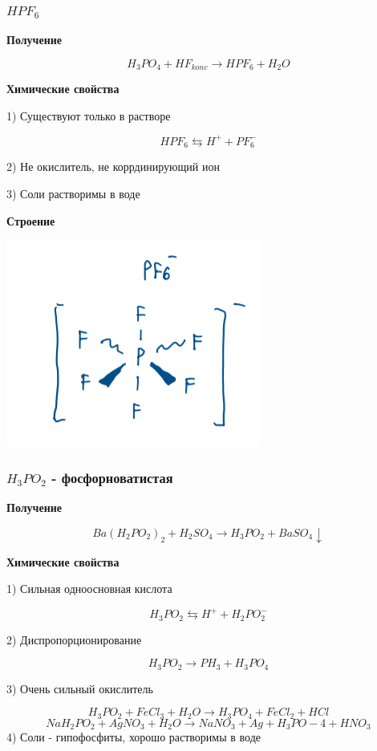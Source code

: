 \subsubsection*{$HPF_6$}

\textbf{Получение}

$$H_3PO_4 + HF_{konc} \rightarrow HPF_6 + H_2O$$

\textbf{Химические свойства}

1) Существуют только в растворе

$$HPF_6 \leftrightarrows H^+ + PF_6^-$$

2) Не окислитель, не коррдинирующий ион

3) Соли растворимы в воде

\textbf{Строение}

\includegraphics{images/9v7.png}

\subsubsection*{$H_3PO_2$ - фосфорноватистая}

\textbf{Получение}

$$Ba(H_2PO_2)_2 + H_2SO_4 \rightarrow H_3PO_2 + BaSO_4 \downarrow$$

\textbf{Химические свойства}

1) Сильная одноосновная кислота

$$H_3PO_2 \leftrightarrows H^+ + H_2PO_2^-$$

2) Диспропорционирование 

$$H_3PO_2 \rightarrow PH_3 + H_3PO_4$$

3) Очень сильный окислитель

$$H_3PO_2 + FeCl_3 + H_2O \rightarrow H_3PO_4 + FeCl_2 + HCl$$
$$NaH_2PO_2 + AgNO_3 + H_2O \rightarrow NaNO_3 + Ag + H_3PO-4 + HNO_3$$
4) Соли - гипофосфиты, хорошо растворимы в воде

